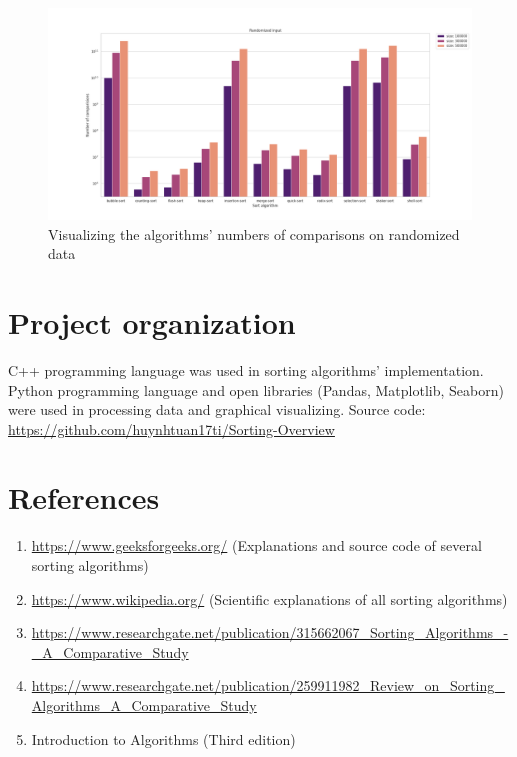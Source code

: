 \documentclass[11pt,a4paper]{article}
\begin{document}
\begin{figure}[H]
  \includegraphics[width = 16cm]{plot/rand_bar.png}
  \centering
  \caption{Visualizing the algorithms' numbers of comparisons on randomized data}
\end{figure}

\section{Project organization}
C++ programming language was used in sorting algorithms' implementation.
Python programming language and open libraries (Pandas, Matplotlib, Seaborn) were used in processing data and graphical visualizing.
\newline
Source code: \url{https://github.com/huynhtuan17ti/Sorting-Overview}

\section{References}
\begin{enumerate}
  \item \url{https://www.geeksforgeeks.org/} (Explanations and source code of several sorting algorithms)\\
  \item \url{https://www.wikipedia.org/} (Scientific explanations of all sorting algorithms)\\
  \item \url{https://www.researchgate.net/publication/315662067_Sorting_Algorithms_-_A_Comparative_Study}\\
  \item \url{https://www.researchgate.net/publication/259911982_Review_on_Sorting_Algorithms_A_Comparative_Study}\\
  \item Introduction to Algorithms (Third edition)\\
\end{enumerate}
\end{document}

